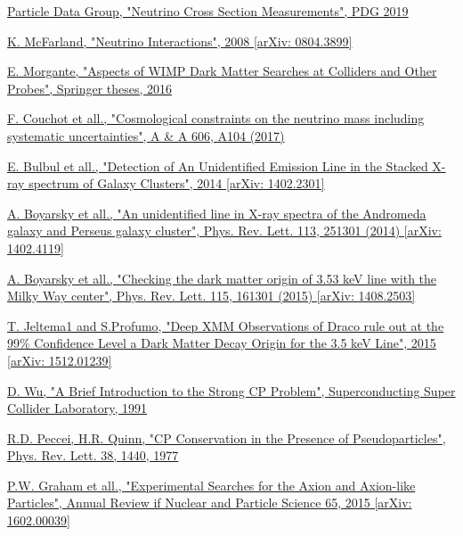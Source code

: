 \documentclass[a4paper, 10pt, openright]{report}
\begin{document}
\begin{thebibliography}{1}
\href{http://pdg.lbl.gov/2019/reviews/rpp2018-rev-nu-cross-sections.pdf}{Particle Data Group,
"Neutrino Cross Section Measurements",
PDG 2019
}

\href{https://arxiv.org/pdf/0804.3899.pdf}{K. McFarland,
"Neutrino Interactions",
2008 [arXiv: 0804.3899]
}

\href{http://inspirehep.net/record/1510610}{E. Morgante,
"Aspects of WIMP Dark Matter Searches at Colliders and Other Probes",
Springer theses, 2016
}

\href{https://www.aanda.org/articles/aa/pdf/2017/10/aa30927-17.pdf}{F. Couchot et all.,
"Cosmological constraints on the neutrino mass including systematic uncertainties",
A \& A 606, A104 (2017)
}

\href{https://arxiv.org/abs/1402.2301}{E. Bulbul et all.,
"Detection of An Unidentified Emission Line in the Stacked X-ray spectrum of Galaxy Clusters",
2014 [arXiv: 1402.2301]
}

\href{https://arxiv.org/abs/1402.4119}{A. Boyarsky et all.,
"An unidentified line in X-ray spectra of the Andromeda galaxy and Perseus galaxy cluster",
Phys. Rev. Lett. 113, 251301 (2014) [arXiv: 1402.4119]
}

\href{https://arxiv.org/abs/1408.2503}{A. Boyarsky et all.,
"Checking the dark matter origin of 3.53 keV line with the Milky Way center",
Phys. Rev. Lett. 115, 161301 (2015) [arXiv: 1408.2503]
}

\href{https://arxiv.org/abs/1512.01239}{T. Jeltema1 and S.Profumo,
"Deep XMM Observations of Draco rule out at the 99\% Confidence Level a Dark Matter Decay Origin for the 3.5 keV Line",
2015 [arXiv: 1512.01239]
}

\href{https://www.osti.gov/servlets/purl/6260191}{D. Wu,
"A Brief Introduction to the Strong CP Problem",
Superconducting Super Collider Laboratory, 1991
}

\href{https://journals.aps.org/prl/abstract/10.1103/PhysRevLett.38.1440}{R.D. Peccei, H.R. Quinn,
"CP Conservation in the Presence of Pseudoparticles",
Phys. Rev. Lett. 38, 1440, 1977
}

\href{https://arxiv.org/abs/1602.00039}{P.W. Graham et all.,
"Experimental Searches for the Axion and Axion-like Particles",
Annual Review if Nuclear and Particle Science 65, 2015 [arXiv: 1602.00039]
}


\end{thebibliography}
\end{document}
